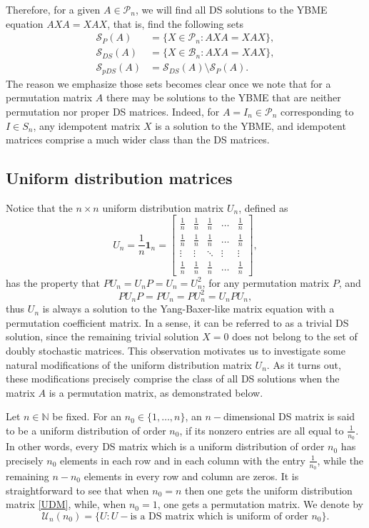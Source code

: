 \documentclass{article}
\theoremstyle{definition}\newtheorem{example}{Example}[section]
\def\U{{\mathcal{U}}}
\def\S{{\mathcal{S}}}
\def\B{{\mathcal{B}}}
\def\P{{\mathcal{P}}}
\begin{document}
	Therefore, for a given $A\in \P_n$, we will find all DS solutions to the YBME equation $AXA=XAX$, that is, find the following sets
	\begin{align*}
		\S_P(A)&=\{X\in \P_n: AXA=XAX\},\\
		\S_{DS}(A)&=\{X\in \B_n: AXA=XAX\},\\
		\S_{pDS}(A)&=\S_{DS}(A)\setminus \S_P(A).
	\end{align*} 
	The reason we emphasize those sets becomes clear once we note that for a permutation matrix $A$ there may be solutions to the YBME that are neither permutation nor proper DS matrices. Indeed, for $A=I_n\in\P_n$ corresponding to $I\in S_n$, any idempotent matrix $X$ is a solution to the YBME, and idempotent matrices comprise a much wider class than the DS matrices.
	
	\subsection{Uniform distribution matrices}
	Notice that the $n\times n$ uniform distribution matrix $U_n$, defined as
	\begin{equation}
		\label{UDM}
		U_n=\frac{1}{n}\mathbf{1}_n=\left[\begin{array}{ccccc}\frac{1}{n} &\frac{1}{n} & \frac{1}{n}& \ldots & \frac{1}{n}\\
			\frac{1}{n} &\frac{1}{n} & \frac{1}{n}& \ldots & \frac{1}{n}\\
			\vdots & \vdots& \ddots & \vdots &\vdots\\
			\frac{1}{n} &\frac{1}{n} & \frac{1}{n}& \ldots & \frac{1}{n}
		\end{array}\right],\end{equation}
	has the property that $PU_n=U_nP=U_n=U_n^2$, for any permutation matrix $P$, and
	$$PU_nP=PU_n=PU_n^2=U_nPU_n,$$
	thus $U_n$ is always a solution to the Yang-Baxer-like matrix equation with a permutation coefficient matrix. In a sense, it can be referred to as a trivial DS solution, since the remaining trivial solution $X=0$ does not belong to the set of doubly stochastic matrices. This observation motivates us to investigate some natural modifications of the uniform distribution matrix $U_n$. As it turns out, these modifications precisely comprise the class of all DS solutions when the matrix $A$ is a permutation matrix, as demonstrated below.
	
	
	
	Let $n\in\mathbb{N}$ be fixed. For an $n_0\in\{1,\ldots,n\}$, an $n-$dimensional DS matrix is said to be a uniform distribution of order $n_0$, if its nonzero entries are all equal to $\frac{1}{n_0}$. 
	In other words, every DS matrix which is a uniform distribution of order $n_0$ has precisely $n_0$ elements in each row and in each column with the entry $\frac{1}{n_0}$, while the remaining $n-n_0$ elements in every row and column are zeros. It is straightforward to see that when $n_0=n$ then one gets the uniform distribution matrix \eqref{UDM}, while, when $n_0=1$, one gets a permutation matrix. We denote by 
	\begin{equation}
		\label{Unn0}
		\U_n(n_0)=\{U: U-\textrm{is a DS matrix which is uniform of order $n_0$}\}.
	\end{equation}
	
\end{document}
